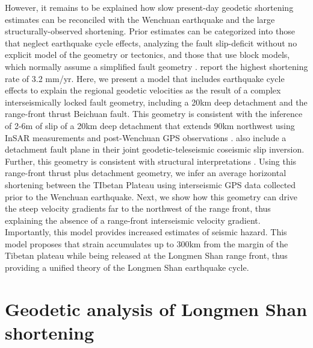 \documentclass[12pt]{article}
\begin{document}
However, it remains to be explained how slow present-day geodetic shortening estimates can be reconciled with the Wenchuan earthquake and the large structurally-observed shortening. Prior estimates can be categorized into those that neglect earthquake cycle effects, analyzing the fault slip-deficit without no explicit model of the geometry or tectonics, \citep{chen00, shen05} and those that use block models, which normally assume a simplified fault geometry \citep{Meade07c, Loveless2011, Burchfiel2008a}. \citet{Loveless2011} report the highest shortening rate of 3.2 mm/yr. Here, we present a model that includes earthquake cycle effects to explain the regional geodetic velocities as the result of a complex interseismically locked fault geometry, including a 20km deep detachment and the range-front thrust Beichuan fault.  This geometry is consistent with the inference of 2-6m of slip of a 20km deep detachment that extends 90km northwest using InSAR measurements and post-Wenchuan GPS observations \citep{Qi2011}. \citet{Fielding2013b} also include a detachment fault plane in their joint geodetic-teleseismic coseismic slip inversion. Further, this geometry is consistent with structural interpretations \citep{Hubbard2010, Li2010}. Using this range-front thrust plus detachment geometry, we infer an average horizontal shortening between the TIbetan Plateau using interseismic GPS data collected prior to the Wenchuan earthquake.  Next, we show how this geometry can drive the steep velocity gradients far to the northwest of the range front, thus explaining the absence of a range-front interseismic velocity gradient. Importantly, this model provides increased estimates of seismic hazard. This model proposes that strain accumulates up to 300km from the margin of the Tibetan plateau while being released at the Longmen Shan range front, thus providing a unified theory of the Longmen Shan earthquake cycle. 

\section{Geodetic analysis of Longmen Shan shortening}
\end{document}

